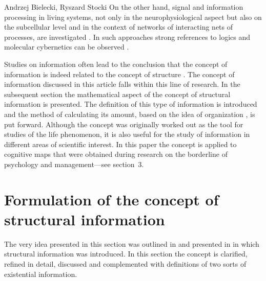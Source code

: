 \begin{artengenv2auth}{Andrzej Bielecki, Ryszard Stocki}
On the other hand, signal and information processing in living systems, not only in the neurophysiological aspect 
\parencite[][]{tadeusiewicz_new_2010} %
 but also on the subcellular level and in the context of networks of interacting nets of processes, are investigated 
\parencite[][chap.5]{kauffman_world_2019}. %
 In such approaches strong references to logics and molecular cybernetics can be observed 
\parencites[][]{boniolo_molecular_2023}[][]{spirin_ribosome_2002}.%




Studies on information often lead to the conclusion that the concept of information is indeed related to the concept of structure 
\parencites[][]{burgin_information_2011}[][]{bielecki_general_2015}[][]{bielecki_information_2022}[][]{tao_information_2021}. %
 The concept of information discussed in this article falls within this line of research. In the subsequent section the mathematical aspect of the concept of structural information is presented. The definition of this type of information is introduced and the method of calculating its amount, based on the idea of organization 
\parencite[][]{hellerman_representation_2006}, %
 is put forward. Although the concept was originally worked out as the tool for studies of the life phenomenon, it is also useful for the study of information in different areas of scientific interest. In this paper the concept is applied to cognitive maps that were obtained during research on the borderline of psychology and management---see section~3.



\section{Formulation of the concept of structural information}

The very idea presented in this section was outlined in 
\parencite[][]{bielecki_general_2015} %
 and presented in 
\parencite[][]{bielecki_information_2022} %
 in which structural information was introduced. In this section the concept is clarified, refined in detail, discussed and complemented with definitions of two sorts of existential information.




\end{artengenv2auth}
